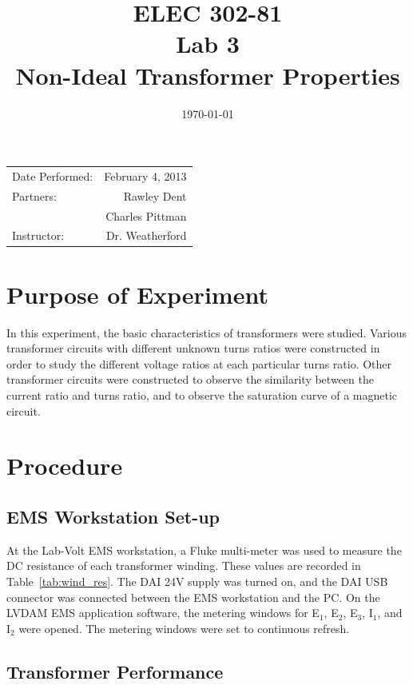 \documentclass{article}
\title{ELEC 302-81\\ Lab 3\\ Non-Ideal Transformer Properties} %
\date{\today} %
\begin{document}
\maketitle

\begin{center}
  \begin{tabular}{lr}
    Date Performed: & February 4, 2013 \\
    Partners: & Rawley Dent \\
              & Charles Pittman \\
    Instructor: & Dr. Weatherford
  \end{tabular}
\end{center}

\pagebreak


\section{Purpose of Experiment}
In this experiment, the basic characteristics of transformers were studied.
Various transformer circuits with different unknown turns ratios were
constructed in order to study the different voltage ratios at each particular
turns ratio. Other transformer circuits were constructed to observe the
similarity between the current ratio and turns ratio, and to observe the
saturation curve of a magnetic circuit.

\section{Procedure}
\subsection{EMS Workstation Set-up}

At the Lab-Volt EMS workstation, a Fluke multi-meter was used to measure the DC
resistance of each transformer winding. These values are recorded in
Table~\ref{tab:wind_res}.  The DAI 24V supply was turned on, and the DAI USB
connector was connected between the EMS workstation and the {PC}. On the LVDAM
EMS application software, the metering windows for E$_1$, E$_2$, E$_3$, I$_1$,
and I$_2$ were opened. The metering windows were set to continuous refresh.

\subsection{Transformer Performance}
\end{document}
